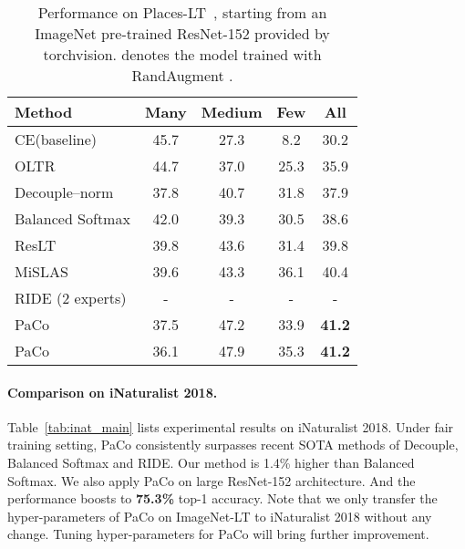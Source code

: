 \documentclass[10pt,twocolumn,letterpaper]{article}
\begin{document}
\begin{table}[t]
	\centering
	\caption{Performance on Places-LT~\cite{Liu_2019_CVPR}, starting from an ImageNet pre-trained ResNet-152 provided by torchvision. \dag denotes the model trained with RandAugment \cite{DBLP:conf/nips/CubukZS020}.}
	\label{tab:place_main}
	{
		\begin{tabular}{l|ccc|c}
			\toprule
			Method & Many & Medium & Few & \textbf{All}      \\
			\midrule
			CE(baseline)      & 45.7 & 27.3 & 8.2 & 30.2     \\
			OLTR              & 44.7 & 37.0 & 25.3 & 35.9    \\
			Decouple--norm & 37.8 & 40.7 & 31.8 & 37.9 \\
			Balanced Softmax     & 42.0 & 39.3 & 30.5 & 38.6 \\
			ResLT                & 39.8 & 43.6 & 31.4 & 39.8 \\
			MiSLAS               & 39.6 & 43.3 & 36.1 & 40.4 \\
			RIDE (2 experts)     & -    & -    & -    & -    \\ 
			\midrule
			PaCo                  & 37.5 & 47.2 & 33.9 & \textbf{41.2} \\
			PaCo \dag             & 36.1 & 47.9 & 35.3 & \textbf{41.2} \\      
			\bottomrule
		\end{tabular}
	}
	
\end{table}

\vspace{-.1in}
\paragraph{Comparison on iNaturalist 2018.}
Table~\ref{tab:inat_main} lists experimental results on iNaturalist 2018. Under fair training setting, PaCo consistently surpasses recent SOTA methods of Decouple, Balanced Softmax and RIDE. Our method is 1.4\% higher than Balanced Softmax. We also apply PaCo on large ResNet-152 architecture. And the performance boosts to \textbf{75.3\%} top-1 accuracy. Note that we only transfer the hyper-parameters of PaCo on ImageNet-LT to iNaturalist 2018 without any change. Tuning hyper-parameters for PaCo will bring further improvement.
\end{document}
